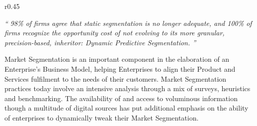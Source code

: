 %
%

\begin{wrapfigure}[12]{r}{0.45\textwidth}
    \vspace{-15pt}
    \begin{center}
        \begin{tcolorbox}[colback=secondary!5,colframe=secondary!60,left=2pt,right=2pt]
            \itshape\large\enquote{%
                98\% of firms agree that static segmentation is no longer adequate,
                and 100\% of firms recognize the opportunity cost of not evolving to its more granular, precision-based,
                inheritor: Dynamic Predictive Segmentation.%
            }
            \begin{flushright}\textcite{dynamic_predictive_segmentation}\end{flushright}
        \end{tcolorbox}
    \end{center}
\end{wrapfigure}

Market Segmentation is an important component in the elaboration of an Enterprise’s Business Model,
helping Enterprises to align their Product and Services fulfilment to the needs of their customers.
Market Segmentation practices today involve an intensive analysis through a mix of surveys,
heuristics and benchmarking.
The availability of and access to voluminous information though a multitude of digital sources has put
additional emphasis on the ability of enterprises to dynamically tweak their Market Segmentation.


